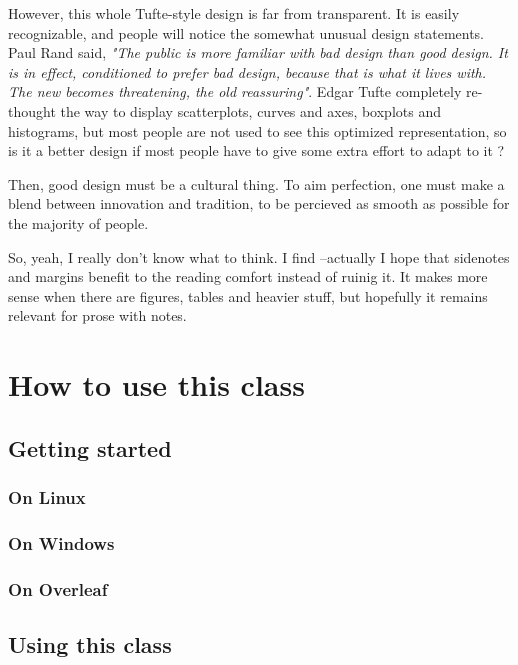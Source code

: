 \documentclass[
    11pt,
]{tufte-style-thesis}
\begin{document}
However, this whole Tufte-style design is far from transparent. It is easily recognizable, and people will notice the somewhat unusual design statements. Paul Rand said, \textit{"The public is more familiar with bad design than good design. It is in effect, conditioned to prefer bad design, because that is what it lives with. The new becomes threatening, the old reassuring"}. Edgar Tufte completely re-thought the way to display scatterplots, curves and axes, boxplots and histograms, but most people are not used to see this optimized representation, so is it a better design if most people have to give some extra effort to adapt to it ?

Then, good design must be a cultural thing. To aim perfection, one must make a blend between innovation and tradition, to be percieved as smooth as possible for the majority of people.

So, yeah, I really don't know what to think. I find --actually I hope that sidenotes and margins benefit to the reading comfort instead of ruinig it. It makes more sense when there are figures, tables and heavier stuff, but hopefully it remains relevant for prose with notes.


\part{How to use this class}

\chapter{Getting started}

\section{On Linux}

\section{On Windows}

\section{On Overleaf}

\chapter{Using this class}
\end{document}
